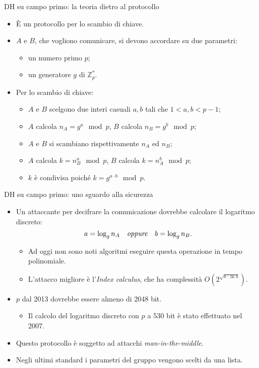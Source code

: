\documentclass[11pt,svgnames,smaller,aspectratio=169,italian]{beamer}
\begin{document}
\begin{frame}{DH su campo primo: la teoria dietro al protocollo}
	\begin{itemize}
		\item È un protocollo per lo scambio di chiave.
		\item $A$ e $B$, che vogliono comunicare, si devono accordare su due parametri:
			\begin{itemize}
				\item un numero primo $p$;
				\item un generatore $g$ di $\mathds{Z}_{p}^{*}$.
			\end{itemize}
		\item Per lo scambio di chiave:
			\begin{itemize}
				\item $A$ e $B$ scelgono due interi casuali $a, b$ tali che $1 < a, b < p - 1$;
				\item $A$ calcola $n_{A} = g^{a} \mod p$, $B$ calcola $n_{B} = g^{b} \mod p$;
				\item $A$ e $B$ si scambiano rispettivamente $n_{A}$ ed $n_{B}$;
				\item $A$ calcola $k = n_{B}^{a} \mod p$, $B$ calcola $k = n_{A}^{b} \mod p$;
				\item $k$ è condivisa poiché $k = g^{a \cdot b} \mod p$.
			\end{itemize}
	\end{itemize}
\end{frame}

\begin{frame}{DH su campo primo: uno sguardo alla sicurezza}
	\begin{itemize}
		\item Un attaccante per decifrare la comunicazione dovrebbe calcolare il logaritmo discreto:
			\begin{equation*}
				a = \log_{g} n_{A}	\quad\text{\emph{oppure}}	\quad b = \log_{g} n_{B}.
			\end{equation*}
			\begin{itemize}
				\item Ad oggi non sono noti algoritmi eseguire questa operazione in tempo polinomiale.
				\item L'attacco migliore è l'\emph{Index calculus}, che ha complessità $O(2^{\sqrt{b \cdot \ln b}})$.
			\end{itemize}
		\item $p$ dal 2013 dovrebbe essere almeno di 2048 bit.
			\begin{itemize}
				\item Il calcolo del logaritmo discreto con $p$ a 530 bit è stato effettuato nel 2007.
			\end{itemize}
		\item Questo protocollo è soggetto ad attacchi \emph{man-in-the-middle}.
		\item Negli ultimi standard i parametri del gruppo vengono scelti da una lista.
	\end{itemize}
\end{frame}
\end{document}
